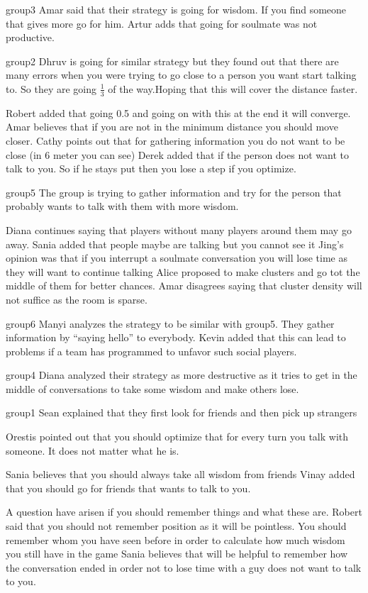 group3
Amar said that their strategy is going for wisdom. If you find someone that gives more go for him.
Artur adds that going for soulmate was not productive.

group2
Dhruv is going for similar strategy but they found out that there are many errors when you were trying to go close to a person you want start talking to. So they are going $\frac{1}{3}$ of the way.Hoping that this will cover the distance faster.

Robert added that going 0.5 and going on with this at the end it will converge.
Amar believes that if you are not in the minimum distance you should move closer.
Cathy points out that for gathering information you do not want to be close (in 6 meter you can see)
Derek added that if the person does not want to talk to you. So if he stays put then you lose a step if you optimize.


group5
The group is trying to gather information and try for the person that probably wants to talk with them with more wisdom.

Diana continues saying that players without many players around them may go away.
Sania added that people maybe are talking but you cannot see it
Jing’s opinion was that if you interrupt a soulmate conversation you will lose time as they will want to continue talking
Alice proposed to make clusters and go tot the middle of them for better chances.
Amar disagrees saying that cluster density will not suffice as the room is sparse.
 
group6
Manyi analyzes the strategy to be similar with group5. They gather information by “saying hello” to everybody.
Kevin added that this can lead to problems if a team has programmed to unfavor such social players.

group4
Diana analyzed their strategy as more destructive as it tries to get in the middle of conversations to take some wisdom and make others lose.

group1
Sean explained that they first look for friends and then pick up strangers

Orestis pointed out that you should optimize  that for every turn you talk with someone. It does not matter what he is.

Sania believes that you should always take all wisdom from friends
Vinay added that you should go for friends that wants to talk to you.

A question have arisen if you should remember things and what these are.
Robert said that you should not remember position as it will be pointless. You should remember whom you have seen before in order to calculate how much wisdom you still have in the game
Sania believes that will be helpful to remember how the conversation ended in order not to lose time with a guy does not want to talk to you.

